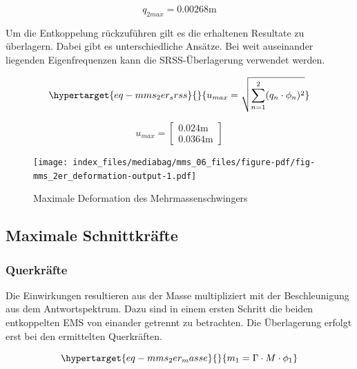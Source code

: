 \documentclass[
  letterpaper,
  DIV=11]{scrreprt}
\begin{document}
\begin{equation}q_{2 max} = 0.00268 \text{m}\end{equation}

Um die Entkoppelung rückzuführen gilt es die erhaltenen Resultate zu
überlagern. Dabei gibt es unterschiedliche Ansätze. Bei weit auseinander
liegenden Eigenfrequenzen kann die SRSS-Überlagerung verwendet werden.

\begin{equation}\protect\hypertarget{eq-mms_2er_srss}{}{
u_{max} = \sqrt{\sum_{n=1}^2 (q_{n} \cdot \phi_n)^2}
}\label{eq-mms_2er_srss}\end{equation}

\begin{equation}u_{max} = \left[\begin{matrix}0.024 \text{m}\\0.0364 \text{m}\end{matrix}\right]\end{equation}

\begin{figure}[H]

{\centering \texttt{[image: index\_files/mediabag/mms\_06\_files/figure-pdf/fig-mms\_2er\_deformation-output-1.pdf]}

}

\caption{\label{fig-mms_2er_deformation}Maximale Deformation des
Mehrmassenschwingers}

\end{figure}

\hypertarget{maximale-schnittkruxe4fte-1}{%
\subsection{Maximale Schnittkräfte}\label{maximale-schnittkruxe4fte-1}}

\hypertarget{querkruxe4fte-1}{%
\subsubsection{Querkräfte}\label{querkruxe4fte-1}}

Die Einwirkungen resultieren aus der Masse multipliziert mit der
Beschleunigung aus dem Antwortspektrum. Dazu sind in einem ersten
Schritt die beiden entkoppelten EMS von einander getrennt zu betrachten.
Die Überlagerung erfolgt erst bei den ermittelten Querkräften.

\begin{equation}\protect\hypertarget{eq-mms_2er_masse}{}{
m_1 = \Gamma \cdot M \cdot \phi_1
}\label{eq-mms_2er_masse}\end{equation}
\end{document}
